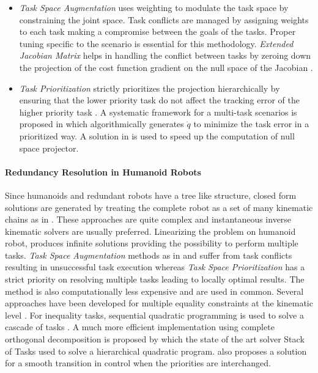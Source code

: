  \begin{itemize}
     \item \textit{Task Space Augmentation} uses weighting to modulate the task space by constraining the joint space\cite{sciavicco1987solving}. Task conflicts are managed by assigning weights to each task making a compromise between the goals of the tasks.  Proper tuning specific to the scenario is essential for this methodology. \textit{Extended Jacobian Matrix} helps in handling the conflict between tasks by zeroing down the projection of the cost function gradient on the null space of the Jacobian \cite{baillieul1985kinematic}.

     \item \textit{Task Prioritization} strictly prioritizes the projection hierarchically by ensuring that the lower priority task do not affect the tracking error of the higher priority task \cite{nakamura1987task}. A systematic framework for a multi-task scenarios is proposed in \cite{siciliano1991general} which algorithmically generates $\dot{q}$ to minimize the task error in a prioritized way. A solution in \cite{Baerlocher1998} is used to speed up the computation of null space projector. 
     
 \end{itemize}

\paragraph{Redundancy Resolution in Humanoid Robots}
Since humanoids and redundant robots have a tree like structure, closed form solutions are generated by treating the complete robot as a set of many kinematic chains as in \cite{ali2010closed,nunez2012explicit}. These approaches are quite complex and instantaneous inverse kinematic solvers are usually preferred. Linearizing the problem on humanoid robot, produces infinite solutions providing the possibility to perform multiple tasks. \textit{Task Space Augmentation} methods as in \cite{tevatia2000inverse} and \cite{salini2009lqp} suffer from task conflicts resulting in unsuccessful task execution whereas \textit{Task Space Prioritization} has a strict priority on resolving multiple tasks leading to locally optimal results.
 The method is also computationally less expensive and are used in common. Several approaches have been developed for multiple equality constraints at the kinematic level \cite{yoshida2006task,mansard2007task,gienger2005task}. For inequality tasks, sequential quadratic programming is used to solve a cascade of tasks \cite{kanoun2009prioritizing}. A much more efficient implementation using complete orthogonal decomposition
is proposed by \cite{Escande2014} which the state of the art solver Stack of Tasks used to solve a hierarchical quadratic program. \cite{jarquin2013real} also proposes a solution for a smooth transition in control when the priorities are interchanged.  


